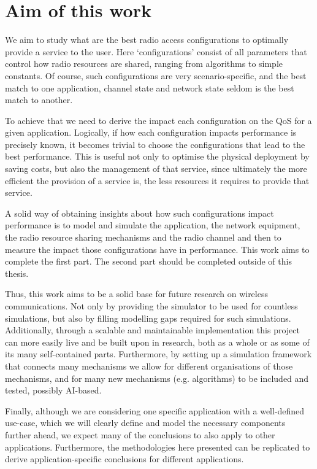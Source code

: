 \section{Aim of this work}
\label{sec:aim}

We aim to study what are the best radio access configurations to optimally provide a service to the user. Here `configurations' consist of all parameters that control how radio resources are shared, ranging from algorithms to simple constants. Of course, such configurations are very scenario-specific, and the best match to one application, channel state and network state seldom is the best match to another.

To achieve that we need to derive the impact each configuration on the \ac{QoS} for a given application. Logically, if how each configuration impacts performance is precisely known, it becomes trivial to choose the configurations that lead to the best performance. This is useful not only to optimise the physical deployment by saving costs, but also the management of that service, since ultimately the more efficient the provision of a service is, the less resources it requires to provide that service.

A solid way of obtaining insights about how such configurations impact performance is to model and simulate the application, the network equipment, the radio resource sharing mechanisms and the radio channel and then to measure the impact those configurations have in performance. This work aims to complete the first part. The second part should be completed outside of this thesis.

Thus, this work aims to be a solid base for future research on wireless communications. Not only by providing the simulator to be used for countless simulations, but also by filling modelling gaps required for such simulations. Additionally, through a scalable and maintainable implementation this project can more easily live and be built upon in research, both as a whole or as some of its many self-contained parts. Furthermore, by setting up a simulation framework that connects many mechanisms we allow for different organisations of those mechanisms, and for many new mechanisms (e.g. algorithms) to be included and tested, possibly AI-based.

Finally, although we are considering one specific application with a well-defined use-case, which we will clearly define and model the necessary components further ahead, we expect many of the conclusions to also apply to other applications. Furthermore, the methodologies here presented can be replicated to derive application-specific conclusions for different applications.

